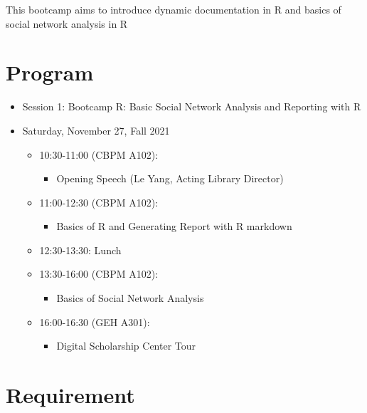 \documentclass[
]{book}
\providecommand{\tightlist}{%
  \setlength{\itemsep}{0pt}\setlength{\parskip}{0pt}}
\begin{document}
This bootcamp aims to introduce dynamic documentation in R and basics of social network analysis in R

\hypertarget{program}{%
\section{Program}\label{program}}

\begin{itemize}
\tightlist
\item
  Session 1: Bootcamp R: Basic Social Network Analysis and Reporting with R
\item
  Saturday, November 27, Fall 2021

  \begin{itemize}
  \tightlist
  \item
    10:30-11:00 (CBPM A102):

    \begin{itemize}
    \tightlist
    \item
      Opening Speech (Le Yang, Acting Library Director)
    \end{itemize}
  \item
    11:00-12:30 (CBPM A102):

    \begin{itemize}
    \tightlist
    \item
      Basics of R and Generating Report with R markdown
    \end{itemize}
  \item
    12:30-13:30: Lunch
  \item
    13:30-16:00 (CBPM A102):

    \begin{itemize}
    \tightlist
    \item
      Basics of Social Network Analysis
    \end{itemize}
  \item
    16:00-16:30 (GEH A301):

    \begin{itemize}
    \tightlist
    \item
      Digital Scholarship Center Tour
    \end{itemize}
  \end{itemize}
\end{itemize}

\hypertarget{requirement}{%
\section{Requirement}\label{requirement}}
\end{document}
